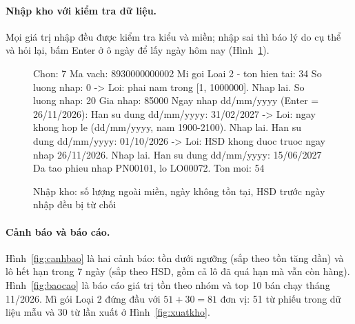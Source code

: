 \paragraph{Nhập kho với kiểm tra dữ liệu.} Mọi giá trị nhập đều được kiểm tra kiểu và miền; nhập sai thì báo
lý do cụ thể và hỏi lại, bấm Enter ở ô ngày để lấy ngày hôm nay (Hình~\ref{fig:nhapkho}).

\begin{figure}[htbp]
\begin{manhinh}
Chon: 7
Ma vach: 8930000000002
Mi goi Loai 2 - ton hien tai: 34
So luong nhap: 0
  -> Loi: phai nam trong [1, 1000000]. Nhap lai.
So luong nhap: 20
Gia nhap: 85000
Ngay nhap dd/mm/yyyy (Enter = 26/11/2026):
Han su dung dd/mm/yyyy: 31/02/2027
  -> Loi: ngay khong hop le (dd/mm/yyyy, nam 1900-2100). Nhap lai.
Han su dung dd/mm/yyyy: 01/10/2026
  -> Loi: HSD khong duoc truoc ngay nhap 26/11/2026. Nhap lai.
Han su dung dd/mm/yyyy: 15/06/2027
Da tao phieu nhap PN00101, lo LO00072. Ton moi: 54
\end{manhinh}
\caption{Nhập kho: số lượng ngoài miền, ngày không tồn tại, HSD trước ngày nhập đều bị từ chối}
\label{fig:nhapkho}
\end{figure}

\paragraph{Cảnh báo và báo cáo.} Hình~\ref{fig:canhbao} là hai cảnh báo: tồn dưới ngưỡng (sắp theo tồn tăng
dần) và lô hết hạn trong 7 ngày (sắp theo HSD, gồm cả lô đã quá hạn mà vẫn còn hàng). Hình~\ref{fig:baocao}
là báo cáo giá trị tồn theo nhóm và top 10 bán chạy tháng 11/2026. Mì gói Loại 2 đứng đầu với
$51 + 30 = 81$ đơn vị: 51 từ phiếu  trong dữ liệu mẫu và 30 từ lần xuất ở Hình~\ref{fig:xuatkho}.

